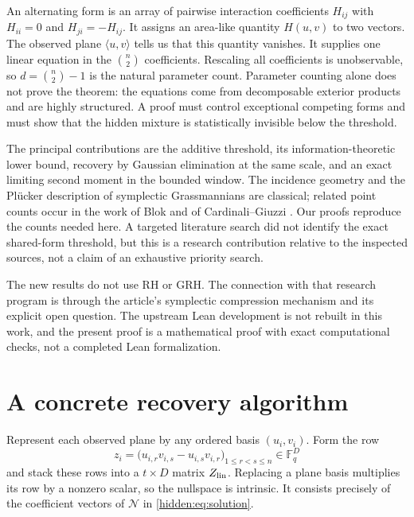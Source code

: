 \documentclass[11pt,a4paper]{article}
\theoremstyle{remark}
\newcommand{\F}{\mathbb F_q}
\begin{document}
An alternating form is an array of pairwise interaction coefficients $H_{ij}$ with $H_{ii}=0$ and $H_{ji}=-H_{ij}$. It assigns an area-like quantity $H(u,v)$ to two vectors. The observed plane $\langle u,v\rangle$ tells us that this quantity vanishes. It supplies one linear equation in the $\binom n2$ coefficients. Rescaling all coefficients is unobservable, so $d=\binom n2-1$ is the natural parameter count. Parameter counting alone does not prove the theorem: the equations come from decomposable exterior products and are highly structured. A proof must control exceptional competing forms and must show that the hidden mixture is statistically invisible below the threshold.

The principal contributions are the additive threshold, its information-theoretic lower bound, recovery by Gaussian elimination at the same scale, and an exact limiting second moment in the bounded window. The incidence geometry and the Pl\"ucker description of symplectic Grassmannians are classical; related point counts occur in the work of Blok and of Cardinali--Giuzzi \cite{blok,cardinali}. Our proofs reproduce the counts needed here. A targeted literature search did not identify the exact shared-form threshold, but this is a research contribution relative to the inspected sources, not a claim of an exhaustive priority search.

The new results do not use RH or GRH. The connection with that research program is through the article's symplectic compression mechanism and its explicit open question. The upstream Lean development is not rebuilt in this work, and the present proof is a mathematical proof with exact computational checks, not a completed Lean formalization.



\section{A concrete recovery algorithm}

Represent each observed plane by any ordered basis $(u_i,v_i)$. Form the row
\[
 z_i=\bigl(u_{i,r}v_{i,s}-u_{i,s}v_{i,r}\bigr)_{1\le r<s\le n}\in\F^D
\]
and stack these rows into a $t\times D$ matrix $Z_{\rm lin}$. Replacing a plane basis multiplies its row by a nonzero scalar, so the nullspace is intrinsic. It consists precisely of the coefficient vectors of $\mathcal N$ in \eqref{hidden:eq:solution}.
\end{document}
